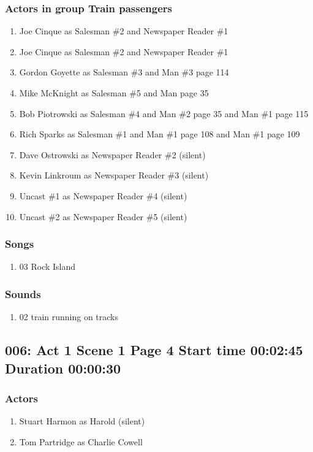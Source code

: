 \subsubsection{Actors in group Train passengers}
\begin{enumerate}
\item Joe Cinque as Salesman \#2 and Newspaper Reader \#1
\item Joe Cinque as Salesman \#2 and Newspaper Reader \#1
\item Gordon Goyette as Salesman \#3 and Man \#3 page 114
\item Mike McKnight as Salesman \#5 and Man page 35
\item Bob Piotrowski as Salesman \#4 and Man \#2 page 35 and Man \#1 page 115
\item Rich Sparks as Salesman \#1 and Man \#1 page 108 and Man \#1 page 109
\item Dave Ostrowski as Newspaper Reader \#2 (silent)
\item Kevin Linkroum as Newspaper Reader \#3 (silent)
\item Uncast \#1 as Newspaper Reader \#4 (silent)
\item Uncast \#2 as Newspaper Reader \#5 (silent)
\end{enumerate}

\subsubsection{Songs}
\begin{enumerate}
\item 03 Rock Island
\end{enumerate}\subsubsection{Sounds}
\begin{enumerate}
\item 02 train running on tracks
\end{enumerate}
\subsection{006: Act 1 Scene 1 Page 4 Start time 00:02:45 Duration 00:00:30}

\subsubsection{Actors}
\begin{enumerate}
\item Stuart Harmon as Harold (silent)
\item Tom Partridge as Charlie Cowell
\end{enumerate}
